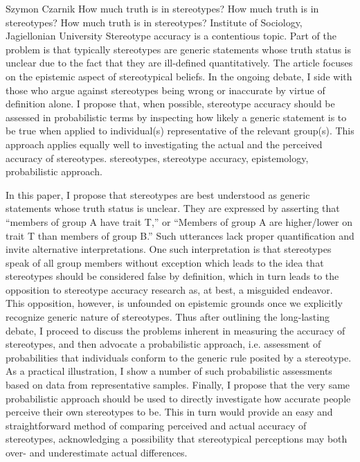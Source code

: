 \begin{artengenv}{Szymon Czarnik}
	{How much truth is in stereotypes?}
	{How much truth is in stereotypes?}
	{How much truth is in stereotypes?}
	{Institute of Sociology, Jagiellonian University}
	{Stereotype accuracy is a contentious topic. Part of the problem is that typically stereotypes are generic statements whose truth status is unclear due to the fact that they are ill-defined quantitatively. The article focuses on the epistemic aspect of stereotypical beliefs. In the ongoing debate, I side with those who argue against stereotypes being wrong or inaccurate by virtue of definition alone. I propose that, when possible, stereotype accuracy should be assessed in probabilistic terms by inspecting how likely a generic statement is to be true when applied to individual(s) representative of the relevant group(s). This approach applies equally well to investigating the actual and the perceived accuracy of stereotypes.}
	{stereotypes, stereotype accuracy, epistemology, probabilistic approach.}

\vspace{2\baselineskip}
\lettrine[loversize=0.13,lines=2,lraise=-0.05,nindent=0em,findent=0.2pt]%
{I}{}n this paper, I propose that stereotypes are best understood as generic statements whose truth status is unclear. They are expressed by asserting that ``members of group A have trait T,'' or ``Members of group A are higher/lower on trait T than members of group B.'' Such utterances lack proper quantification and invite alternative interpretations. One such interpretation is that stereotypes speak of all group members without exception which leads to the idea that stereotypes should be considered false by definition, which in turn leads to the opposition to stereotype accuracy research as, at best, a misguided endeavor. This opposition, however, is unfounded on epistemic grounds once we explicitly recognize generic nature of stereotypes. Thus after outlining the long-lasting debate, I proceed to discuss the problems inherent in measuring the accuracy of stereotypes, and then advocate a probabilistic approach, i.e. assessment of probabilities that individuals conform to the generic rule posited by a stereotype. As a practical illustration, I show a number of such probabilistic assessments based on data from representative samples. Finally, I propose that the very same probabilistic approach should be used to directly investigate how accurate people perceive their own stereotypes to be. This in turn would provide an easy and straightforward method of comparing perceived and actual accuracy of stereotypes, acknowledging a possibility that stereotypical perceptions may both over- and underestimate actual differences.



\end{artengenv}
